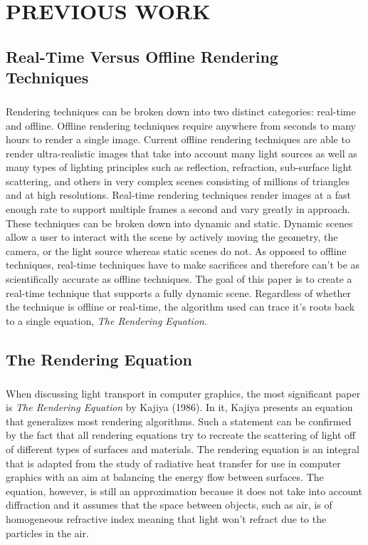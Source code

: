 \chapter{PREVIOUS WORK} \label{sec:prevwork}

\section{Real-Time Versus Offline Rendering Techniques}
\paragraph{}
Rendering techniques can be broken down into two distinct categories: real-time and offline.  Offline rendering techniques require anywhere from seconds to many hours to render a single image.  Current offline rendering techniques are able to render ultra-realistic images that take into account many light sources as well as many types of lighting principles such as reflection, refraction, sub-surface light scattering, and others in very complex scenes consisting of millions of triangles and at high resolutions.  Real-time rendering techniques render images at a fast enough rate to support multiple frames a second and vary greatly in approach.  These techniques can be broken down into dynamic and static.  Dynamic scenes allow a user to interact with the scene by actively moving the geometry, the camera, or the light source whereas static scenes do not.  As opposed to offline techniques, real-time techniques have to make sacrifices and therefore can't be as scientifically accurate as offline techniques.  The goal of this paper is to create a real-time technique that supports a fully dynamic scene.  Regardless of whether the technique is offline or real-time, the algorithm used can trace it's roots back to a single equation, \textit{The Rendering Equation}.

\section{The Rendering Equation} \label{sec:render}
\paragraph{}
When discussing light transport in computer graphics, the most significant paper is \textit{The Rendering Equation} by Kajiya (1986).  In it, Kajiya presents an equation that generalizes most rendering algorithms.  Such a statement can be confirmed by the fact that all rendering equations try to recreate the scattering of light off of different types of surfaces and materials.  The rendering equation is an integral that is adapted from the study of radiative heat transfer for use in computer graphics with an aim at balancing the energy flow between surfaces.  The equation, however, is still an approximation because it does not take into account diffraction and it assumes that the space between objects, such as air, is of homogeneous refractive index meaning that light won't refract due to the particles in the air.

